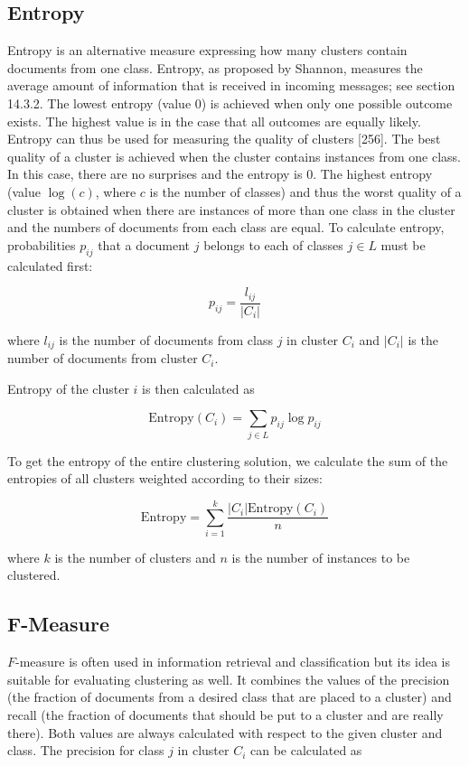 \documentclass[11pt,openany,executivepaper]{book}
\begin{document}
\subsection*{Entropy}
Entropy is an alternative measure expressing how many clusters contain documents from one class. Entropy, as proposed by Shannon, measures the average amount of information that is received in incoming messages; see section 14.3.2. The lowest entropy (value 0) is achieved when only one possible outcome exists. The highest value is in the case that all outcomes are equally likely. Entropy can thus be used for measuring the quality of clusters [256]. The best quality of a cluster is achieved when the cluster contains instances from one class. In this case, there are no surprises and the entropy is 0. The highest entropy (value $\log(c)$, where $c$ is the number of classes) and thus the worst quality of a cluster is obtained when there are instances of more than one class in the cluster and the numbers of documents from each class are equal. To calculate entropy, probabilities $p_{i j}$ that a document $j$ belongs to each of classes $j \in L$ must be calculated first:

\begin{equation}
p_{i j}=\frac{l_{i j}}{\left|C_{i}\right|}
\end{equation}

where $l_{i j}$ is the number of documents from class $j$ in cluster $C_{i}$ and $\left|C_{i}\right|$ is the number of documents from cluster $C_{i}$.

Entropy of the cluster $i$ is then calculated as

\begin{equation}
\text{Entropy}\left(C_{i}\right)=\sum_{j \in L} p_{i j} \log p_{i j}
\end{equation}

To get the entropy of the entire clustering solution, we calculate the sum of the entropies of all clusters weighted according to their sizes:

\begin{equation}
\text{Entropy}=\sum_{i=1}^{k} \frac{\left|C_{i}\right| \text{Entropy}\left(C_{i}\right)}{n}
\end{equation}

where $k$ is the number of clusters and $n$ is the number of instances to be clustered.

\subsection*{F-Measure}
$F$-measure is often used in information retrieval and classification but its idea is suitable for evaluating clustering as well. It combines the values of the precision (the fraction of documents from a desired class that are placed to a cluster) and recall (the fraction of documents that should be put to a cluster and are really there). Both values are always calculated with respect to the given cluster and class. The precision for class $j$ in cluster $C_{i}$ can be calculated as
\end{document}
